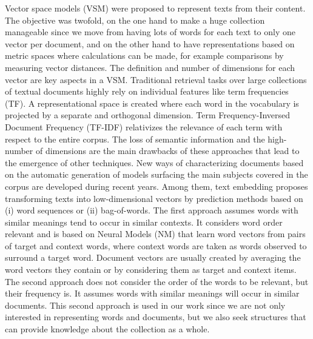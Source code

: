 Vector space models (VSM) were proposed to represent texts from their content. The objective was twofold, on the one hand to make a huge collection manageable since we move from having lots of words for each text to only one vector per document, and on the other hand to have representations based on metric spaces where calculations can be made, for example comparisons by measuring vector distances. The definition and number of dimensions for each vector are key aspects in a VSM. Traditional retrieval tasks over large collections of textual documents highly rely on individual features like term frequencies (TF)\cite{Hearst1999}. A representational space is created where each word in the vocabulary is projected by a separate and orthogonal dimension. Term Frequency-Inversed Document Frequency (TF-IDF) relativizes the relevance of each term with respect to the entire corpus. The loss of semantic information and the high-number of dimensions are the main drawbacks of these approaches that lead to the emergence of other techniques. New ways of characterizing documents based on the automatic generation of models surfacing the main subjects covered in the corpus are developed during recent years. Among them, text embedding proposes transforming texts into low-dimensional vectors by prediction methods based on (i) word sequences or (ii) bag-of-words. The first approach assumes words with similar meanings tend to occur in similar contexts. It considers word order relevant and is based on Neural Models (NM) that learn word vectors from pairs of target and context words, where context words are taken as words observed to surround a target word. Document vectors are usually created by averaging the word vectors they contain or by considering them as target and context items. The second approach does not consider the order of the words to be relevant, but their frequency is. It assumes words with similar meanings will occur in similar documents. This second approach is used in our work since we are not only interested in representing words and documents, but we also seek  structures that can provide knowledge about the collection as a whole.

